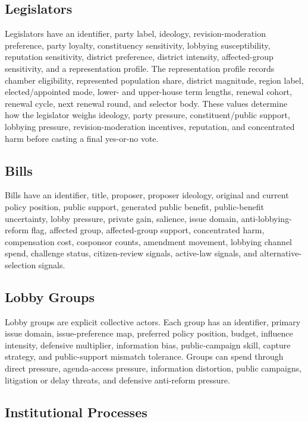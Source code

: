 \documentclass[manuscript]{acmart}
\begin{document}
\subsection{Legislators}

Legislators have an identifier, party label, ideology, revision-moderation preference, party loyalty, constituency sensitivity, lobbying susceptibility, reputation sensitivity, district preference, district intensity, affected-group sensitivity, and a representation profile. The representation profile records chamber eligibility, represented population share, district magnitude, region label, elected/appointed mode, lower- and upper-house term lengths, renewal cohort, renewal cycle, next renewal round, and selector body. These values determine how the legislator weighs ideology, party pressure, constituent/public support, lobbying pressure, revision-moderation incentives, reputation, and concentrated harm before casting a final yes-or-no vote.

\subsection{Bills}

Bills have an identifier, title, proposer, proposer ideology, original and current policy position, public support, generated public benefit, public-benefit uncertainty, lobby pressure, private gain, salience, issue domain, anti-lobbying-reform flag, affected group, affected-group support, concentrated harm, compensation cost, cosponsor counts, amendment movement, lobbying channel spend, challenge status, citizen-review signals, active-law signals, and alternative-selection signals.

\subsection{Lobby Groups}

Lobby groups are explicit collective actors. Each group has an identifier, primary issue domain, issue-preference map, preferred policy position, budget, influence intensity, defensive multiplier, information bias, public-campaign skill, capture strategy, and public-support mismatch tolerance. Groups can spend through direct pressure, agenda-access pressure, information distortion, public campaigns, litigation or delay threats, and defensive anti-reform pressure.

\subsection{Institutional Processes}
\end{document}

